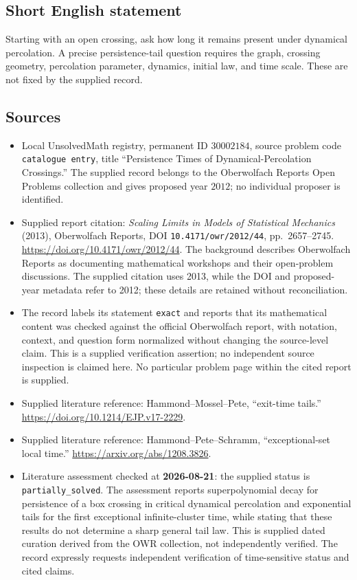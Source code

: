 \documentclass[11pt]{article}
\begin{document}
\subsection{Short English statement}
Starting with an open crossing, ask how long it remains present under dynamical percolation. A precise persistence-tail question requires the graph, crossing geometry, percolation parameter, dynamics, initial law, and time scale. These are not fixed by the supplied record.
\subsection{Sources}
\begin{itemize}
\item Local UnsolvedMath registry, permanent ID \(30002184\), source problem code \texttt{catalogue entry}, title ``Persistence Times of Dynamical-Percolation Crossings.'' The supplied record belongs to the Oberwolfach Reports Open Problems collection and gives proposed year \(2012\); no individual proposer is identified.
\item Supplied report citation: \emph{Scaling Limits in Models of Statistical Mechanics} (2013), Oberwolfach Reports, DOI \texttt{10.4171/owr/2012/44}, pp.\ 2657--2745. \url{https://doi.org/10.4171/owr/2012/44}. The background describes Oberwolfach Reports as documenting mathematical workshops and their open-problem discussions. The supplied citation uses 2013, while the DOI and proposed-year metadata refer to 2012; these details are retained without reconciliation.
\item The record labels its statement \texttt{exact} and reports that its mathematical content was checked against the official Oberwolfach report, with notation, context, and question form normalized without changing the source-level claim. This is a supplied verification assertion; no independent source inspection is claimed here. No particular problem page within the cited report is supplied.
\item Supplied literature reference: Hammond--Mossel--Pete, ``exit-time tails.'' \url{https://doi.org/10.1214/EJP.v17-2229}.
\item Supplied literature reference: Hammond--Pete--Schramm, ``exceptional-set local time.'' \url{https://arxiv.org/abs/1208.3826}.
\item Literature assessment checked at \textbf{2026-08-21}: the supplied status is \texttt{partially\_solved}. The assessment reports superpolynomial decay for persistence of a box crossing in critical dynamical percolation and exponential tails for the first exceptional infinite-cluster time, while stating that these results do not determine a sharp general tail law. This is supplied dated curation derived from the OWR collection, not independently verified. The record expressly requests independent verification of time-sensitive status and cited claims.
\end{itemize}
\end{document}
